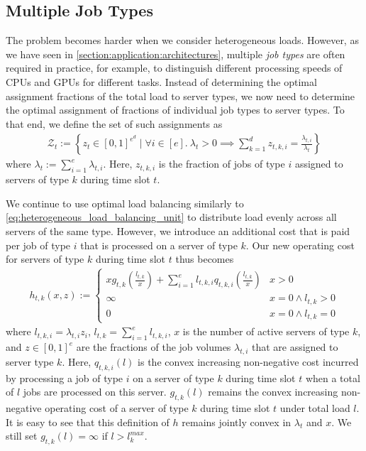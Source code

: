\subsection{Multiple Job Types}\label{section:application:dispatching:multiple_load_types}

The problem becomes harder when we consider heterogeneous loads. However, as we have seen in \autoref{section:application:architectures}, multiple \emph{job types} are often required in practice, for example, to distinguish different processing speeds of CPUs and GPUs for different tasks. Instead of determining the optimal assignment fractions of the total load to server types, we now need to determine the optimal assignment of fractions of individual job types to server types. To that end, we define the set of such assignments as \begin{align*}
    \mathcal{Z}_t := \left\{z_t \in [0,1]^{e^d} \mid \forall i \in [e].\ \lambda_t > 0 \implies \sum_{k=1}^d z_{t,k,i} = \frac{\lambda_{t,i}}{\lambda_t}\right\}
\end{align*} where $\lambda_t := \sum_{i=1}^e \lambda_{t,i}$. Here, $z_{t,k,i}$ is the fraction of jobs of type $i$ assigned to servers of type $k$ during time slot $t$.

We continue to use optimal load balancing similarly to \autoref{eq:heterogeneous_load_balancing_unit} to distribute load evenly across all servers of the same type. However, we introduce an additional cost that is paid per job of type $i$ that is processed on a server of type $k$. Our new operating cost for servers of type $k$ during time slot $t$ thus becomes \begin{align}\label{eq:multiple_load_types_load_balancing_unit}
    h_{t,k}(x,z) := \begin{cases}
        x g_{t,k}\left(\frac{l_{t,k}}{x}\right) + \sum_{i=1}^e l_{t,k,i} q_{t,k,i}\left(\frac{l_{t,k}}{x}\right) & x > 0 \\
        \infty                                                                                                   & x = 0 \land l_{t,k} > 0 \\
        0                                                                                                        & x = 0 \land l_{t,k} = 0
    \end{cases}
\end{align} where $l_{t,k,i} = \lambda_{t,i} z_i$, $l_{t,k} = \sum_{i=1}^e l_{t,k,i}$, $x$ is the number of active servers of type $k$, and $z \in [0,1]^e$ are the fractions of the job volumes $\lambda_{t,i}$ that are assigned to server type $k$. Here, $q_{t,k,i}(l)$ is the convex increasing non-negative cost incurred by processing a job of type $i$ on a server of type $k$ during time slot $t$ when a total of $l$ jobs are processed on this server. $g_{t,k}(l)$ remains the convex increasing non-negative operating cost of a server of type $k$ during time slot $t$ under total load $l$. It is easy to see that this definition of $h$ remains jointly convex in $\lambda_t$ and $x$. We still set $g_{t,k}(l) = \infty$ if $l > l_k^{max}$.

